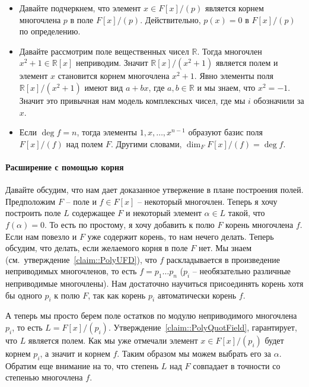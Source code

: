 \begin{remarks}
\begin{itemize}
\item Давайте подчеркнем, что элемент $x\in F[x]/(p)$ является корнем многочлена $p$ в поле $F[x]/(p)$.
Действительно, $p(x) = 0$ в $F[x]/(p)$ по определению.

\item Давайте рассмотрим поле вещественных чисел $\mathbb R$.
Тогда многочлен $x^2 + 1\in \mathbb R[x]$ неприводим.
Значит $\mathbb R[x]/(x^2 +1)$ является полем и элемент $x$ становится корнем многочлена $x^2 + 1$.
Явно элементы поля $\mathbb R[x]/(x^2 + 1)$ имеют вид $a + bx$, где $a, b\in \mathbb R$ и мы знаем, что $x^2 = -1$.
Значит это привычная нам модель комплексных чисел, где мы $i$ обозначили за $x$.

\item Если $\deg f = n$, тогда элементы $1, x, \ldots, x^{n-1}$ образуют базис поля $F[x]/(f)$ над полем $F$.
Другими словами, $\dim_F F[x]/(f) = \deg f$.
\end{itemize}
\end{remarks}

\paragraph{Расширение с помощью корня}

Давайте обсудим, что нам дает доказанное утвержение в плане построения полей.
Предположим $F$ -- поле и $f\in F[x]$ -- некоторый многочлен.
Теперь я хочу построить поле $L$ содержащее $F$ и некоторый элемент $\alpha \in L$ такой, что $f(\alpha) = 0$.
То есть по простому, я хочу добавить к полю $F$ корень многочлена $f$.
Если нам повезло и $F$ уже содержит корень, то нам нечего делать.
Теперь обсудим, что делать, если желаемого корня в поле $F$ нет.
Мы знаем (см.~утверждение~\ref{claim::PolyUFD}), что $f$ раскладывается в произведение неприводимых многочленов, то есть $f = p_1\ldots p_n$ ($p_i$ -- необязательно различные неприводимые многочлены).
Нам достаточно научиться присоединять корень хотя бы одного $p_i$ к полю $F$, так как корень $p_i$ автоматически корень $f$.

А теперь мы просто берем поле остатков по модулю неприводимого многочлена $p_i$, то есть $L = F[x]/(p_i)$.
Утверждение~\ref{claim::PolyQuotField}, гарантирует, что $L$ является полем.
Как мы уже отмечали элемент $x\in F[x]/(p_i)$ будет корнем $p_i$, а значит и корнем $f$.
Таким образом мы можем выбрать его за $\alpha$.
Обратим еще внимание на то, что степень $L$ над $F$ совпадает в точности со степенью многочлена $f$.


